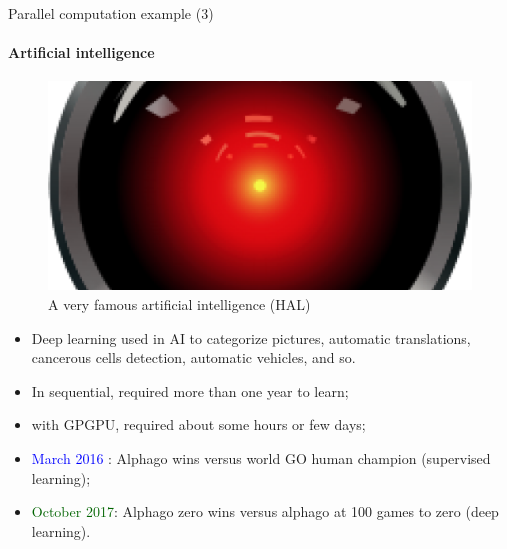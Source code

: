 \documentclass[compress,10pt,aspectratio=169]{beamer}
\begin{document}
\begin{frame}[fragile]{Parallel computation example (3)}
  \framesubtitle{Artificial intelligence}
  \small
  \begin{multicols}{2}
        \begin{figure}[h]
            \includegraphics[width=\linewidth]{../Images/HAL.png}
            \caption{A very famous artificial intelligence (HAL)}
        \end{figure}
        \begin{itemize}
        \item Deep learning used in AI to categorize pictures, automatic translations, cancerous cells detection, automatic vehicles, and so.
        \item In sequential, required more than one year to learn;
        \item with GPGPU, required about some hours or few days;
        \item \textcolor{blue}{March 2016} : Alphago wins versus world GO human champion (supervised learning);
        \item \textcolor{DarkGreen}{October 2017}: Alphago zero wins versus alphago at 100 games to zero (deep learning).
  \end{itemize}
  \end{multicols}
\end{frame}
\end{document}
